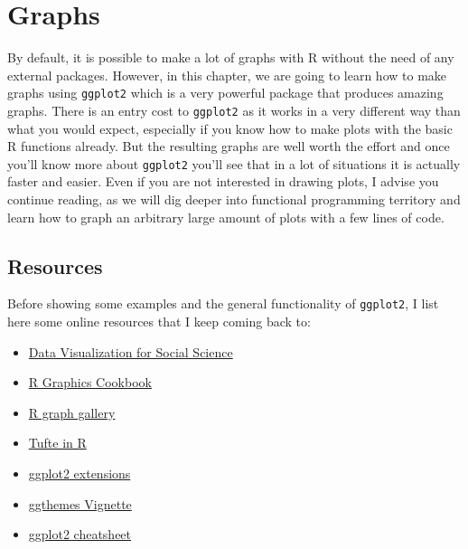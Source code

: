 \documentclass[]{gitbook}
\theoremstyle{definition}
\theoremstyle{definition}
\theoremstyle{definition}
\theoremstyle{remark}
\begin{document}
\hypertarget{graphs}{%
\section{Graphs}\label{graphs}}

By default, it is possible to make a lot of graphs with R without the
need of any external packages. However, in this chapter, we are going to
learn how to make graphs using \texttt{ggplot2} which is a very powerful
package that produces amazing graphs. There is an entry cost to
\texttt{ggplot2} as it works in a very different way than what you would
expect, especially if you know how to make plots with the basic R
functions already. But the resulting graphs are well worth the effort
and once you'll know more about \texttt{ggplot2} you'll see that in a
lot of situations it is actually faster and easier. Even if you are not
interested in drawing plots, I advise you continue reading, as we will
dig deeper into functional programming territory and learn how to graph
an arbitrary large amount of plots with a few lines of code.

\hypertarget{resources}{%
\subsection{Resources}\label{resources}}

Before showing some examples and the general functionality of
\texttt{ggplot2}, I list here some online resources that I keep coming
back to:

\begin{itemize}
\item
  \href{http://socviz.co/}{Data Visualization for Social Science}
\item
  \href{http://www.cookbook-r.com/Graphs/}{R Graphics Cookbook}
\item
  \href{http://www.r-graph-gallery.com/portfolio/ggplot2-package/}{R
  graph gallery}
\item
  \href{http://motioninsocial.com/tufte/}{Tufte in R}
\item
  \href{http://www.ggplot2-exts.org/gallery/}{ggplot2 extensions}
\item
  \href{https://cran.r-project.org/web/packages/ggthemes/vignettes/ggthemes.html}{ggthemes
  Vignette}
\item
  \href{https://www.rstudio.com/wp-content/uploads/2015/03/ggplot2-cheatsheet.pdf}{ggplot2
  cheatsheet}
\end{itemize}
\end{document}
